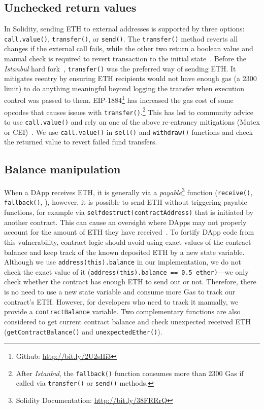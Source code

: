 \subsection{Unchecked return values}
In Solidity, sending ETH to external addresses is supported by three options: \texttt{call.value()}, \texttt{transfer()}, or \texttt{send()}. The \texttt{transfer()} method reverts all changes if the external call fails, while the other two return a boolean value and manual check is required to revert transaction to the initial state~\cite{SoliditySendEther}. Before the \textit{Istanbul} hard fork~\cite{IstanbulUpgrades}, \texttt{transfer()} was the preferred way of sending ETH. It mitigates reentry by ensuring ETH recipients would not have enough gas (\ie a 2300 limit) to do anything meaningful beyond logging the transfer when execution control was passed to them. EIP-1884\footnote{Github: \url{http://bit.ly/2U2sHi3}} has increased the gas cost of some opcodes that causes issues with \texttt{transfer()}.\footnote{After \textit{Istanbul}, the \texttt{fallback()} function consumes more than 2300 Gas if called via \texttt{transfer()} or \texttt{send()} methods.} This has led to community advice to use \texttt{call.value()} and rely on one of the above re-entrancy mitigations (\ie Mutex or CEI)~\cite{ConsensysStopTran,ChainSecurity}. We use \texttt{call.value()} in \texttt{sell()} and \texttt{withdraw()} functions and check the returned value to revert failed fund transfers.

\subsection{Balance manipulation}
\label{sec:unexpected}

When a DApp receives ETH, it is generally via a \textit{payable}\footnote{Solidity Documentation: \url{http://bit.ly/38FRRrQ}} function (\ie \texttt{receive()}, \texttt{fallback()}, \etc), however, it is possible to send ETH without triggering payable functions, for example via \texttt{selfdestruct(contractAddress)} that is initiated by another contract. This can cause an oversight where DApps may not properly account for the amount of ETH they have received~\cite{UnexpectedEth}. To fortify DApp code from this vulnerability, contract logic should avoid using exact values of the contract balance and keep track of the known deposited ETH by a new state variable. Although we use \texttt{address(this).balance} in our implementation, we do not check the exact value of it (\ie  \texttt{address(this).balance == 0.5 ether)}---we only check whether the contract has enough ETH to send out or not. Therefore, there is no need to use a new state variable and consume more Gas to track our contract's ETH. However, for developers who need to track it manually, we provide a \texttt{contractBalance} variable. Two complementary functions are also considered to get current contract balance and check unexpected received ETH (\ie \texttt{getContractBalance()} and \texttt{unexpectedEther()}).

